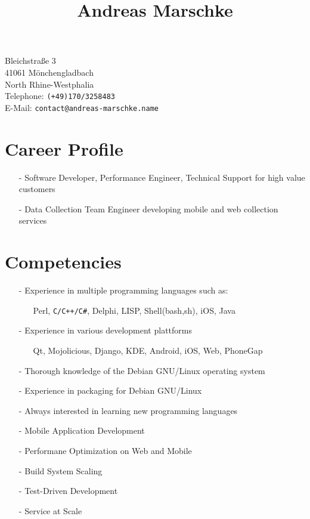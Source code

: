 \documentclass[12pt]{article}
\title{\textbf{Andreas Marschke}}
\author{}
\date{}
\begin{document}
\maketitle

Bleichstraße 3 \\
41061 Mönchengladbach \\
North Rhine-Westphalia \\
Telephone: \texttt{(+49)170/3258483} \\
E-Mail: \texttt{contact@andreas-marschke.name}

\thispagestyle{empty}
\section*{Career Profile}
\begin{itemize}
  \item[-] Software Developer, Performance Engineer, Technical Support for high value customers
  \item[-] Data Collection Team Engineer developing mobile and web collection services
\end{itemize}

\section*{Competencies}
\begin{itemize}
  \item[-] Experience in multiple programming languages such as:
    \begin{itemize}
      \item[] Perl, \verb*|C/C++/C#|, Delphi, LISP, Shell(bash,sh), iOS, Java
    \end{itemize}

  \item[-] Experience in various development plattforms
    \begin{itemize}
      \item[] Qt, Mojolicious, Django, KDE, Android, iOS, Web, PhoneGap
    \end{itemize}
  \item[-] Thorough knowledge of the Debian GNU/Linux operating
    system
  \item[-] Experience in packaging for Debian GNU/Linux
  \item[-] Always interested in learning new programming
    languages
  \item[-] Mobile Application Development
  \item[-] Performane Optimization on Web and Mobile
  \item[-] Build System Scaling
  \item[-] Test-Driven Development
  \item[-] Service at Scale 
\end{itemize}
\end{document}
